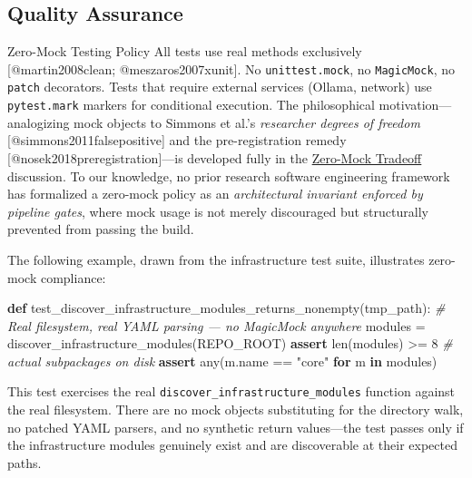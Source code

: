 \documentclass[
  ignorenonframetext,
]{beamer}
\author{\texorpdfstring{}{}}
\date{}
\newenvironment{Shaded}{}{}
\newcommand{\BuiltInTok}[1]{\textcolor[rgb]{0.00,0.50,0.00}{#1}}
\newcommand{\CommentTok}[1]{\textcolor[rgb]{0.38,0.63,0.69}{\textit{#1}}}
\newcommand{\ControlFlowTok}[1]{\textcolor[rgb]{0.00,0.44,0.13}{\textbf{#1}}}
\newcommand{\DecValTok}[1]{\textcolor[rgb]{0.25,0.63,0.44}{#1}}
\newcommand{\KeywordTok}[1]{\textcolor[rgb]{0.00,0.44,0.13}{\textbf{#1}}}
\newcommand{\NormalTok}[1]{#1}
\newcommand{\OperatorTok}[1]{\textcolor[rgb]{0.40,0.40,0.40}{#1}}
\newcommand{\StringTok}[1]{\textcolor[rgb]{0.25,0.44,0.63}{#1}}
\newcounter{none} %
\begin{document}
\subsection{Quality Assurance}\label{quality-assurance}

\begin{frame}[fragile]{Zero-Mock Testing Policy}
\protect{}\label{zero-mock-testing-policy}
All tests use real methods exclusively {[}@martin2008clean;
@meszaros2007xunit{]}. No \texttt{unittest.mock}, no \texttt{MagicMock},
no \texttt{patch} decorators. Tests that require external services
(Ollama, network) use \texttt{pytest.mark} markers for conditional
execution. The philosophical motivation---analogizing mock objects to
Simmons et al.'s \emph{researcher degrees of freedom}
{[}@simmons2011falsepositive{]} and the pre-registration remedy
{[}@nosek2018preregistration{]}---is developed fully in the
\href{05a_zeromock_tradeoff.md\#the-zero-mock-tradeoff}{Zero-Mock
Tradeoff} discussion. To our knowledge, no prior research software
engineering framework has formalized a zero-mock policy as an
\emph{architectural invariant enforced by pipeline gates}, where mock
usage is not merely discouraged but structurally prevented from passing
the build.

The following example, drawn from the infrastructure test suite,
illustrates zero-mock compliance:

\begin{Shaded}
\begin{Highlighting}[]
\KeywordTok{def}\NormalTok{ test\_discover\_infrastructure\_modules\_returns\_nonempty(tmp\_path):}
    \CommentTok{\# Real filesystem, real YAML parsing — no MagicMock anywhere}
\NormalTok{    modules }\OperatorTok{=}\NormalTok{ discover\_infrastructure\_modules(REPO\_ROOT)}
    \ControlFlowTok{assert} \BuiltInTok{len}\NormalTok{(modules) }\OperatorTok{\textgreater{}=} \DecValTok{8}           \CommentTok{\# actual subpackages on disk}
    \ControlFlowTok{assert} \BuiltInTok{any}\NormalTok{(m.name }\OperatorTok{==} \StringTok{"core"} \ControlFlowTok{for}\NormalTok{ m }\KeywordTok{in}\NormalTok{ modules)}
\end{Highlighting}
\end{Shaded}

This test exercises the real \texttt{discover\_infrastructure\_modules}
function against the real filesystem. There are no mock objects
substituting for the directory walk, no patched YAML parsers, and no
synthetic return values---the test passes only if the infrastructure
modules genuinely exist and are discoverable at their expected paths.
\end{frame}
\end{document}
